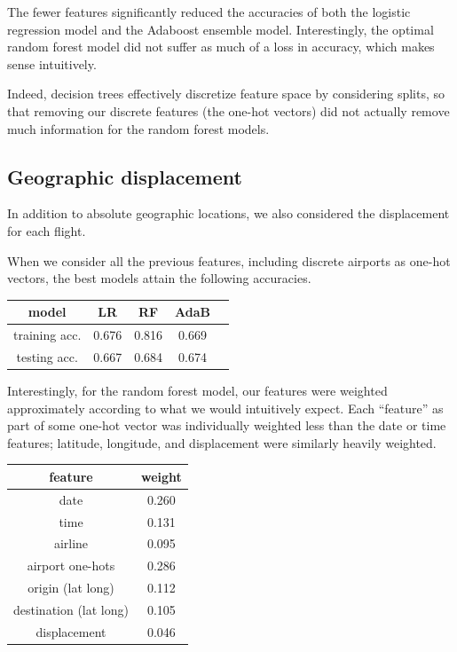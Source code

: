 \documentclass{article}
\begin{document}
\begin{multicols}{2}
The fewer features significantly reduced the accuracies
of both the logistic regression model and the Adaboost ensemble model.
Interestingly, the optimal random forest model
did not suffer as much of a loss in accuracy,
which makes sense intuitively.

Indeed, decision trees effectively discretize feature space
by considering splits,
so that removing our discrete features (the one-hot vectors)
did not actually remove much information for the random forest models.

\subsection{Geographic displacement}

In addition to absolute geographic locations,
we also considered the displacement
for each flight.

When we consider all the previous features,
including discrete airports as one-hot vectors,
the best models attain the following accuracies.

\begin{center}
    \begin{tabular}{c|cccc}
        model &
          LR & RF & AdaB \\\hline
        training acc. &
          0.676 & 0.816 & 0.669 \\
        testing acc. &
         0.667 & 0.684 & 0.674
    \end{tabular}
\end{center}

Interestingly, for the random forest model,
our features were weighted approximately
according to what we would intuitively expect.
Each ``feature'' as part of some one-hot vector
was individually weighted less than the date or time features;
latitude, longitude, and displacement were similarly
heavily weighted.

\begin{center}
    \begin{tabular}{c|c}
        feature & weight \\\hline
        date & 0.260 \\
        time & 0.131 \\
        airline & 0.095 \\
        airport one-hots & 0.286 \\
        origin (lat long) & 0.112 \\
        destination (lat long) & 0.105 \\
        displacement & 0.046
    \end{tabular}
\end{center}


\end{multicols}
\end{document}
